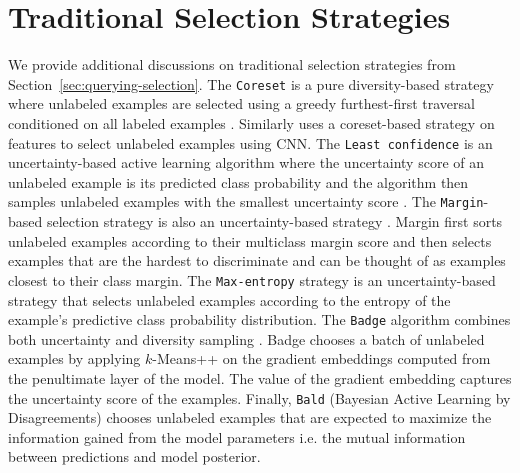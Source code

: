 \section{Traditional Selection Strategies}
\label{app:trad-strategy}
We provide additional discussions on traditional selection strategies from Section~\ref{sec:querying-selection}.
The \texttt{Coreset} is a pure diversity-based strategy where unlabeled examples are selected using a greedy furthest-first traversal conditioned on all labeled examples \citep{sener2017active, geifman2017deep, citovsky2021batch}. Similarly \citet{agarwal2020contextual} uses a coreset-based strategy on features to select unlabeled examples using CNN. The \texttt{Least confidence} is an uncertainty-based active learning algorithm where the uncertainty score of an unlabeled example is its predicted class probability and the algorithm then samples unlabeled examples with the smallest uncertainty score \citep{settles2009active, settles2011theories, wang2014new}. The \texttt{Margin}-based selection strategy is also an uncertainty-based strategy \citep{tong2001support, balcan2009agnostic, settles2009active}. Margin first sorts unlabeled examples according to their multiclass margin score and then selects examples that are the hardest to discriminate and can be thought of as examples closest to their class margin. The \texttt{Max-entropy} strategy \cite{wang2014new, kremer2014active, diao2023active} is an uncertainty-based strategy that selects unlabeled examples according to the entropy of the example's predictive class probability distribution. The \texttt{Badge} algorithm combines both uncertainty and diversity sampling \citep{ash2019deep, ash2021gone}. Badge chooses a batch of unlabeled examples by applying $k$-Means++ \citep{arthur2006k} on the gradient embeddings computed from the penultimate layer of the model. The value of the gradient embedding captures the uncertainty score of the examples. Finally, \texttt{Bald} (Bayesian Active Learning by Disagreements)  \citep{kirsch2019batchbald, pmlr-v70-gal17a} chooses unlabeled examples that are expected to maximize the information gained from the model parameters i.e. the mutual information between predictions and model posterior.


















